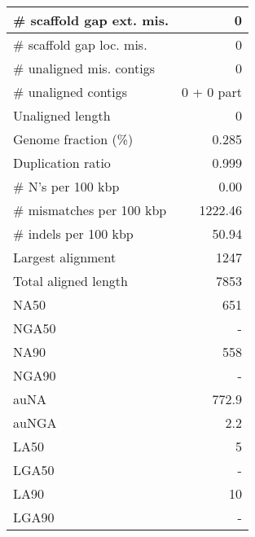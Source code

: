 \documentclass[12pt,a4paper]{article}
\begin{document}
\begin{table}[ht]
\begin{center}
\begin{tabular}{|l*{1}{|r}|}
\# scaffold gap ext. mis. & 0 \\ \hline
\# scaffold gap loc. mis. & 0 \\ \hline
\# unaligned mis. contigs & 0 \\ \hline
\# unaligned contigs & 0 + 0 part \\ \hline
Unaligned length & 0 \\ \hline
Genome fraction (\%) & 0.285 \\ \hline
Duplication ratio & 0.999 \\ \hline
\# N's per 100 kbp & 0.00 \\ \hline
\# mismatches per 100 kbp & 1222.46 \\ \hline
\# indels per 100 kbp & 50.94 \\ \hline
Largest alignment & 1247 \\ \hline
Total aligned length & 7853 \\ \hline
NA50 & 651 \\ \hline
NGA50 & - \\ \hline
NA90 & 558 \\ \hline
NGA90 & - \\ \hline
auNA & 772.9 \\ \hline
auNGA & 2.2 \\ \hline
LA50 & 5 \\ \hline
LGA50 & - \\ \hline
LA90 & 10 \\ \hline
LGA90 & - \\ \hline
\end{tabular}
\end{center}
\end{table}
\end{document}
